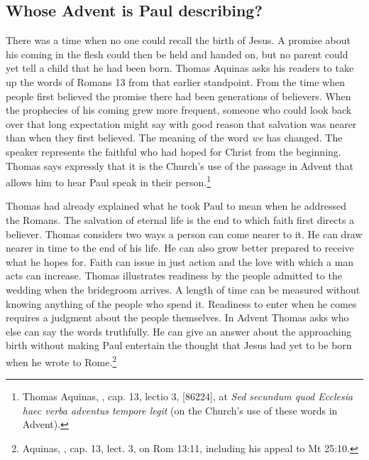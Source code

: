
\subsection{Whose Advent is Paul describing?}

There was a time when no one could recall the birth of Jesus. A promise about his coming in the flesh could then be held and handed on, but no parent could yet tell a child that he had been born. Thomas Aquinas asks his readers to take up the words of Romans 13 from that earlier standpoint. From the time when people first believed the promise there had been generations of believers. When the prophecies of his coming grew more frequent, someone who could look back over that long expectation might say with good reason that salvation was nearer than when they first believed. The meaning of the word \emph{we} has changed. The speaker represents the faithful who had hoped for Christ from the beginning. Thomas says expressly that it is the Church's use of the passage in Advent that allows him to hear Paul speak in their person.\footnote{Thomas Aquinas, , cap. 13, lectio 3, [86224], at \emph{Sed secundum quod Ecclesia haec verba adventus tempore legit} (on the Church's use of these words in Advent).}

Thomas had already explained what he took Paul to mean when he addressed the Romans. The salvation of eternal life is the end to which faith first directs a believer. Thomas considers two ways a person can come nearer to it. He can draw nearer in time to the end of his life. He can also grow better prepared to receive what he hopes for. Faith can issue in just action and the love with which a man acts can increase. Thomas illustrates readiness by the people admitted to the wedding when the bridegroom arrives. A length of time can be measured without knowing anything of the people who spend it. Readiness to enter when he comes requires a judgment about the people themselves. In Advent Thomas asks who else can say the words truthfully. He can give an answer about the approaching birth without making Paul entertain the thought that Jesus had yet to be born when he wrote to Rome.\footnote{Aquinas, , cap. 13, lect. 3, on Rom 13:11, including his appeal to Mt 25:10.}

